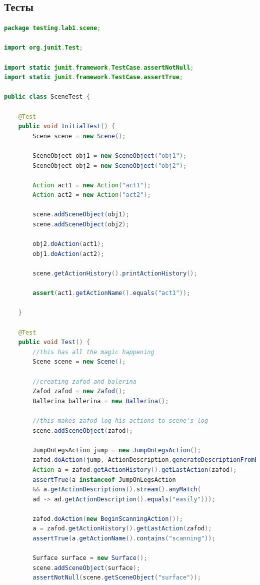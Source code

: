 \subsection{Тесты}
\begin{lstlisting}[language=java]
package testing.lab1.scene;

import org.junit.Test;

import static junit.framework.TestCase.assertNotNull;
import static junit.framework.TestCase.assertTrue;

public class SceneTest {

	@Test
	public void InitialTest() {
		Scene scene = new Scene();
		
		SceneObject obj1 = new SceneObject("obj1");
		SceneObject obj2 = new SceneObject("obj2");
		
		Action act1 = new Action("act1");
		Action act2 = new Action("act2");
		
		scene.addSceneObject(obj1);
		scene.addSceneObject(obj2);
		
		obj2.doAction(act1);
		obj1.doAction(act2);
		
		scene.getActionHistory().printActionHistory();
		
		assert(act1.getActionName().equals("act1"));

	}

	@Test
	public void Test() {
		//this has all the magic happening
		Scene scene = new Scene();
		
		//creating zafod and balerina
		Zafod zafod = new Zafod();
		Ballerina ballerina = new Ballerina();
		
		//this makes zafod log his actions to scene's log
		scene.addSceneObject(zafod);
		
		JumpOnLegsAction jump = new JumpOnLegsAction();
		zafod.doAction(jump, ActionDescription.generateDescriptionFromEnum(ActionDescriptionEnum.easily), ActionDescription.generate_LikeSceneObject_Description(ballerina));
		Action a = zafod.getActionHistory().getLastAction(zafod);
		assertTrue(a instanceof JumpOnLegsAction 
		&& a.getActionDescriptions().stream().anyMatch(
		ad -> ad.getActionDescription().equals("easily")));
		
		zafod.doAction(new BeginScanningAction());
		a = zafod.getActionHistory().getLastAction(zafod);
		assertTrue(a.getActionName().contains("scanning"));
		
		Surface surface = new Surface();
		scene.addSceneObject(surface);
		assertNotNull(scene.getSceneObject("surface"));
		

\end{lstlisting}
